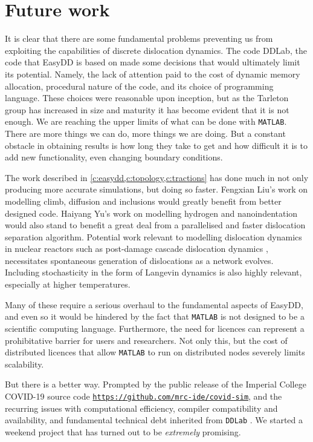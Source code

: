 \chapter{Future work}
\label{c:future}

It is clear that there are some fundamental problems preventing us from exploiting the capabilities of discrete dislocation dynamics. The code DDLab, the code that EasyDD is based on made some decisions that would ultimately limit its potential. Namely, the lack of attention paid to the cost of dynamic memory allocation, procedural nature of the code, and its choice of programming language. These choices were reasonable upon inception, but as the Tarleton group has increased in size and maturity it has become evident that it is not enough. We are reaching the upper limits of what can be done with \texttt{MATLAB}. There are more things we can do, more things we are doing. But a constant obstacle in obtaining results is how long they take to get and how difficult it is to add new functionality, even changing boundary conditions.

The work described in \cref{c:easydd,c:topology,c:tractions} has done much in not only producing more accurate simulations, but doing so faster. Fengxian Liu's work on modelling climb, diffusion and inclusions would greatly benefit from better designed code. Haiyang Yu's work on modelling hydrogen \cite{YU2018} and nanoindentation would also stand to benefit a great deal from a parallelised and faster dislocation separation algorithm. Potential work relevant to modelling dislocation dynamics in nuclear reactors such as post-damage cascade dislocation dynamics \cite{sand2014radiation}, necessitates spontaneous generation of dislocations as a network evolves. Including stochasticity in the form of Langevin dynamics \cite{li2019diffusion} is also highly relevant, especially at higher temperatures.

Many of these require a serious overhaul to the fundamental aspects of EasyDD, and even so it would be hindered by the fact that \texttt{MATLAB} is not designed to be a scientific computing language. Furthermore, the need for licences can represent a prohibitative barrier for users and researchers. Not only this, but the cost of distributed licences that allow \texttt{MATLAB} to run on distributed nodes severely limits scalability.

But there is a better way. Prompted by the public release of the Imperial College COVID-19 source code \href{https://github.com/mrc-ide/covid-sim}{\texttt{https://github.com/mrc-ide/covid-sim}}, and the recurring issues with computational efficiency, compiler compatibility and availability, and fundamental technical debt inherited from \texttt{DDLab} \cite{ddlab}. We started a weekend project that has turned out to be \emph{extremely} promising.

